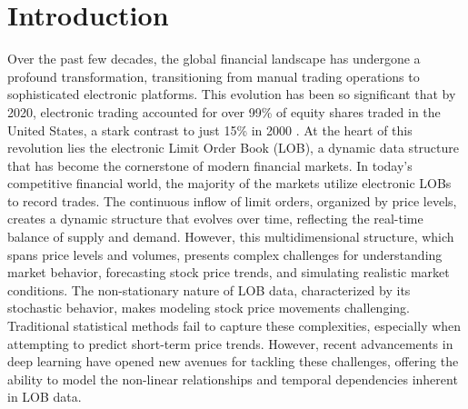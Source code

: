 \section{Introduction}
Over the past few decades, the global financial landscape has undergone a profound transformation, transitioning from manual trading operations to sophisticated electronic platforms. This evolution has been so significant that by 2020, electronic trading accounted for over 99\% of equity shares traded in the United States, a stark contrast to just 15\% in 2000 \cite{kissell2020algorithmic}. At the heart of this revolution lies the electronic Limit Order Book (LOB), a dynamic data structure that has become the cornerstone of modern financial markets.
In today's competitive financial world, the majority of the markets utilize electronic LOBs to record trades. 
The continuous inflow of limit orders, organized by price levels, creates a dynamic structure that evolves over time, reflecting the real-time balance of supply and demand. However, this multidimensional structure, which spans price levels and volumes, presents complex challenges for understanding market behavior, forecasting stock price trends, and simulating realistic market conditions.
The non-stationary nature of LOB data, characterized by its stochastic behavior, makes modeling stock price movements challenging. Traditional statistical methods fail to capture these complexities, especially when attempting to predict short-term price trends. However, recent advancements in deep learning have opened new avenues for tackling these challenges, offering the ability to model the non-linear relationships and temporal dependencies inherent in LOB data.


